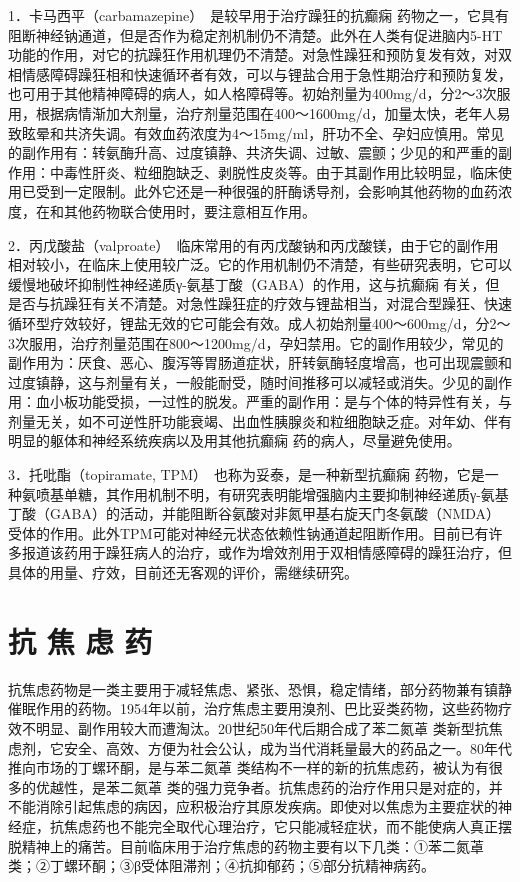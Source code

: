 1．卡马西平（carbamazepine）　是较早用于治疗躁狂的抗癫痫
药物之一，它具有阻断神经钠通道，但是否作为稳定剂机制仍不清楚。此外在人类有促进脑内5-HT功能的作用，对它的抗躁狂作用机理仍不清楚。对急性躁狂和预防复发有效，对双相情感障碍躁狂相和快速循环者有效，可以与锂盐合用于急性期治疗和预防复发，也可用于其他精神障碍的病人，如人格障碍等。初始剂量为400mg/d，分2～3次服用，根据病情渐加大剂量，治疗剂量范围在400～1600mg/d，加量太快，老年人易致眩晕和共济失调。有效血药浓度为4～15mg/ml，肝功不全、孕妇应慎用。常见的副作用有：转氨酶升高、过度镇静、共济失调、过敏、震颤；少见的和严重的副作用：中毒性肝炎、粒细胞缺乏、剥脱性皮炎等。由于其副作用比较明显，临床使用已受到一定限制。此外它还是一种很强的肝酶诱导剂，会影响其他药物的血药浓度，在和其他药物联合使用时，要注意相互作用。

2．丙戊酸盐（valproate）　临床常用的有丙戊酸钠和丙戊酸镁，由于它的副作用相对较小，在临床上使用较广泛。它的作用机制仍不清楚，有些研究表明，它可以缓慢地破坏抑制性神经递质γ-氨基丁酸（GABA）的作用，这与抗癫痫
有关，但是否与抗躁狂有关不清楚。对急性躁狂症的疗效与锂盐相当，对混合型躁狂、快速循环型疗效较好，锂盐无效的它可能会有效。成人初始剂量400～600mg/d，分2～3次服用，治疗剂量范围在800～1200mg/d，孕妇禁用。它的副作用较少，常见的副作用为：厌食、恶心、腹泻等胃肠道症状，肝转氨酶轻度增高，也可出现震颤和过度镇静，这与剂量有关，一般能耐受，随时间推移可以减轻或消失。少见的副作用：血小板功能受损，一过性的脱发。严重的副作用：是与个体的特异性有关，与剂量无关，如不可逆性肝功能衰竭、出血性胰腺炎和粒细胞缺乏症。对年幼、伴有明显的躯体和神经系统疾病以及用其他抗癫痫
药的病人，尽量避免使用。

3．托吡酯（topiramate,
TPM）　也称为妥泰，是一种新型抗癫痫
药物，它是一种氨喷基单糖，其作用机制不明，有研究表明能增强脑内主要抑制神经递质γ-氨基丁酸（GABA）的活动，并能阻断谷氨酸对非氮甲基右旋天门冬氨酸（NMDA）受体的作用。此外TPM可能对神经元状态依赖性钠通道起阻断作用。目前已有许多报道该药用于躁狂病人的治疗，或作为增效剂用于双相情感障碍的躁狂治疗，但具体的用量、疗效，目前还无客观的评价，需继续研究。


\section{抗 焦 虑 药}

抗焦虑药物是一类主要用于减轻焦虑、紧张、恐惧，稳定情绪，部分药物兼有镇静催眠作用的药物。1954年以前，治疗焦虑主要用溴剂、巴比妥类药物，这些药物疗效不明显、副作用较大而遭淘汰。20世纪50年代后期合成了苯二氮䓬
类新型抗焦虑剂，它安全、高效、方便为社会公认，成为当代消耗量最大的药品之一。80年代推向市场的丁螺环酮，是与苯二氮䓬
类结构不一样的新的抗焦虑药，被认为有很多的优越性，是苯二氮䓬
类的强力竞争者。抗焦虑药的治疗作用只是对症的，并不能消除引起焦虑的病因，应积极治疗其原发疾病。即使对以焦虑为主要症状的神经症，抗焦虑药也不能完全取代心理治疗，它只能减轻症状，而不能使病人真正摆脱精神上的痛苦。目前临床用于治疗焦虑的药物主要有以下几类：①苯二氮䓬
类；②丁螺环酮；③β受体阻滞剂；④抗抑郁药；⑤部分抗精神病药。

